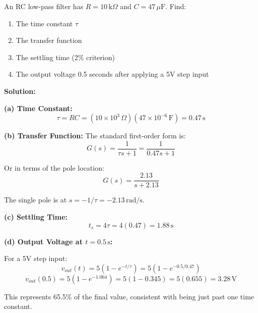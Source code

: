 \begin{examplebox}
An RC low-pass filter has $R = 10\,\text{k}\Omega$ and $C = 47\,\mu\text{F}$. Find:
\begin{enumerate}[label=(\alph*)]
    \item The time constant $\tau$
    \item The transfer function
    \item The settling time (2\% criterion)
    \item The output voltage 0.5 seconds after applying a 5V step input
\end{enumerate}

\textbf{Solution:}

\textbf{(a) Time Constant:}
\begin{equation}
\tau = RC = (10 \times 10^3\,\Omega)(47 \times 10^{-6}\,\text{F}) = 0.47\,\text{s}
\end{equation}

\textbf{(b) Transfer Function:}
The standard first-order form is:
\begin{equation}
G(s) = \frac{1}{\tau s + 1} = \frac{1}{0.47s + 1}
\end{equation}

Or in terms of the pole location:
\begin{equation}
G(s) = \frac{2.13}{s + 2.13}
\end{equation}

The single pole is at $s = -1/\tau = -2.13\,\text{rad/s}$.

\textbf{(c) Settling Time:}
\begin{equation}
t_s = 4\tau = 4(0.47) = 1.88\,\text{s}
\end{equation}

\textbf{(d) Output Voltage at $t = 0.5\,\text{s}$:}

For a 5V step input:
\begin{equation}
v_{out}(t) = 5\left(1 - e^{-t/\tau}\right) = 5\left(1 - e^{-0.5/0.47}\right)
\end{equation}
\begin{equation}
v_{out}(0.5) = 5\left(1 - e^{-1.064}\right) = 5(1 - 0.345) = 5(0.655) = \boxed{3.28\,\text{V}}
\end{equation}

This represents 65.5\% of the final value, consistent with being just past one time constant.
\end{examplebox}

